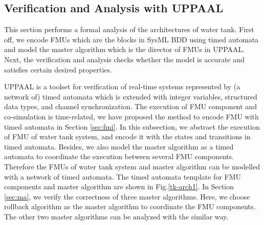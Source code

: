 \subsection{Verification and Analysis with UPPAAL}
\label{sec:mauppaal}
This section performs a formal analysis of the architectures of water tank. First off, we encode FMUs which are the blocks in SysML BDD using timed automata and model the master algorithm which is the director of FMUs in UPPAAL. Next, the verification and analysis checks whether the model is accurate and satisfies certain desired properties. 

UPPAAL \cite{BehrmannDLHPYH06} is a toolset for verification of real-time systems represented by (a network of) timed automata which is extended with integer variables, structured data types, and channel synchronization. The execution of FMU component and co-simulation is time-related, we have proposed the method to encode FMU with timed automata in Section \ref{sec:fmi}. In this subsection, we abstract the execution of FMU of water tank system, and encode it with the states and transitions in timed automata. Besides, we also model the master algorithm as a timed automata to coordinate the execution between several FMU components. Therefore the FMUs of water tank system and master algorithm can be modelled with a network of timed automata. The timed automata template for FMU components and master algorithm are shown in Fig.\ref{tk-arch1}. In Section \ref{sec:ma}, we verify the correctness of three master algorithms. Here, we choose rollback algorithm as the master algorithm to coordinate the FMU components. The other two master algorithms can be analyzed with the similar way. 

